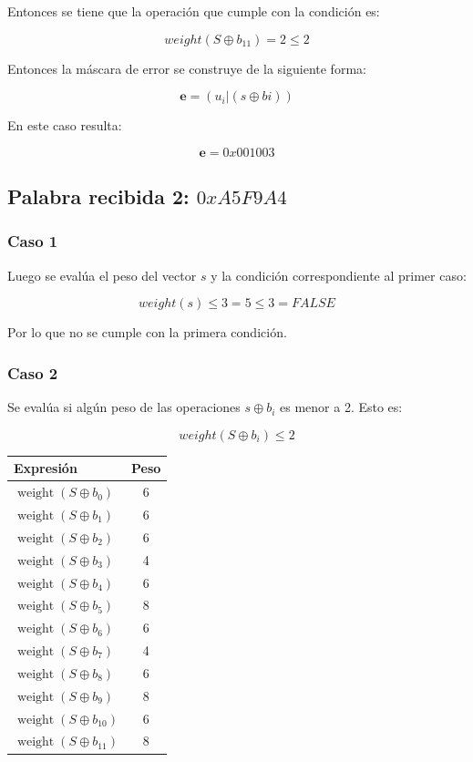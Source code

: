 Entonces se tiene que la operación que cumple con la condición es:

$$ weight(S \oplus b_{11}) = 2 \leq 2$$

Entonces la máscara de error se construye de la siguiente forma:

$$ \textbf{e} = (u_{i} | (s \oplus bi)) $$

En este caso resulta:

$$ \boxed{\textbf{e} = 0x001003}$$

\subsection{Palabra recibida 2: $0xA5F9A4$}

\subsubsection*{Caso 1}

Luego se evalúa el peso del vector $s$ y la condición correspondiente al primer caso:

$$ weight(s) \leq 3 = 5 \leq 3 = FALSE $$

Por lo que no se cumple con la primera condición.

\subsubsection*{Caso 2}

Se evalúa si algún peso de las operaciones $s \oplus b_{i}$ es menor a 2. Esto es:

$$ weight(S \oplus b_{i}) \leq 2 $$

\begin{table}[H]
    \centering
    \begin{tabular}{lc}
        \hline
        \textbf{Expresión} & \textbf{Peso} \\
        \hline
        $\operatorname{weight}(S \oplus b_0)$  & 6  \\
        $\operatorname{weight}(S \oplus b_1)$  & 6  \\
        $\operatorname{weight}(S \oplus b_2)$  & 6  \\
        $\operatorname{weight}(S \oplus b_3)$  & 4  \\
        $\operatorname{weight}(S \oplus b_4)$  & 6  \\
        $\operatorname{weight}(S \oplus b_5)$  & 8  \\
        $\operatorname{weight}(S \oplus b_6)$  & 6  \\
        $\operatorname{weight}(S \oplus b_7)$  & 4  \\
        $\operatorname{weight}(S \oplus b_8)$  & 6  \\
        $\operatorname{weight}(S \oplus b_9)$  & 8  \\
        $\operatorname{weight}(S \oplus b_{10})$ & 6 \\
        $\operatorname{weight}(S \oplus b_{11})$ & 8 \\
        \hline
    \end{tabular}
\end{table}

